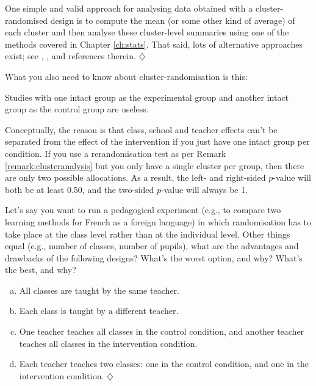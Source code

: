 \documentclass[a4paper]{tufte-book}\usepackage[]{graphicx}\usepackage[]{xcolor}
\newcommand*{\parend}[1][$\diamondsuit$]{%
\leavevmode\unskip\penalty9999 \hbox{}\nobreak\hfill
    \quad\hbox{#1}%
}
\begin{document}
\label{remark:clusteranalysis}
  One simple and valid approach for analysing data obtained with 
  a cluster-randomised design is to compute the mean (or some other kind of average) 
  of each cluster and then analyse these cluster-level summaries using one of the
  methods covered in Chapter \ref{ch:stats}.
  That said, lots of alternative approaches exist; 
  see \citet{Vanhove2015}, \citet{Vanhove2020c}, and references therein.
\parend

\medskip


What you also need to know about cluster-randomisation is this:

 \begin{framed}
   Studies with one intact group as the experimental group and another
   intact group as the control group are useless.
 \end{framed}

 Conceptually, the reason is that class, school and teacher effects can't be separated
 from the effect of the intervention if you just have one intact group
 per condition.
 If you use a rerandomisation test as per Remark \ref{remark:clusteranalysis}
 but you only have a single cluster per group, 
 then there are only two possible allocations.
 As a result, the left- and right-sided $p$-value will both be at least 0.50,
 and the two-sided $p$-value will always be 1.


Let's say you want to run a pedagogical experiment (e.g.,
to compare two learning methods for French as a foreign language)
in which randomisation has to take place at the class level rather than at the
individual level.
Other things equal (e.g., number of classes, number of pupils),
what are the advantages and drawbacks of the following designs?
What's the worst option, and why? What's the best, and why?

\begin{enumerate}[(a)]
  \item All classes are taught by the same teacher.
  \item Each class is taught by a different teacher.
  \item One teacher teaches all classes in the control condition,
        and another teacher teaches all classes in the intervention
        condition.
  \item Each teacher teaches two classes: one in the control condition,
        and one in the intervention condition. \parend
\end{enumerate}
\end{document}
